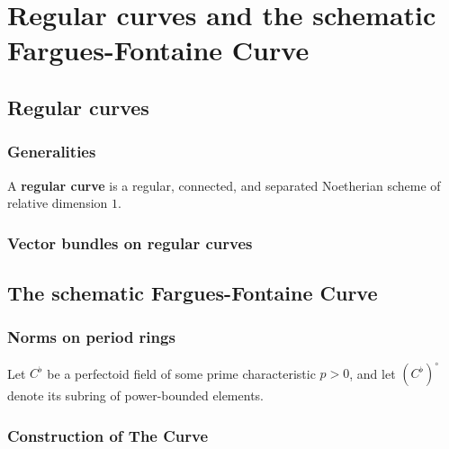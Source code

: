 \section{Regular curves and the schematic Fargues-Fontaine Curve}
    \subsection{Regular curves}
        \subsubsection{Generalities}
            \begin{definition} \label{def: regular_curves}
                A \textbf{regular curve} is a regular, connected, and separated Noetherian scheme of relative dimension $1$.
            \end{definition}
        
        \subsubsection{Vector bundles on regular curves}
    
    \subsection{The schematic Fargues-Fontaine Curve}
        \subsubsection{Norms on period rings}
            \begin{convention}
                Let $C^{\flat}$ be a perfectoid field of some prime characteristic $p > 0$, and let $(C^{\flat})^{\circ}$ denote its subring of power-bounded elements.
            \end{convention}
        
        \subsubsection{Construction of The Curve}